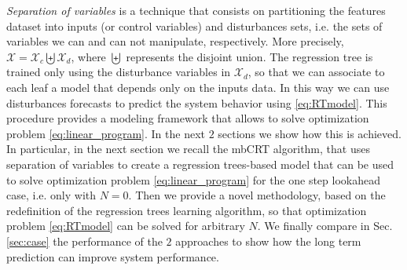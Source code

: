 \textcolor[rgb]{0.00,0.00,1.00}{
\emph{Separation of variables} is a technique that consists on partitioning the features dataset into inputs (or control variables) and disturbances sets, i.e. the sets of variables we can and can not manipulate, respectively. More precisely, $\mathcal{X} = \mathcal{X}_c\biguplus\mathcal{X}_d$, where $\biguplus$ represents the disjoint union. The regression tree is trained only using the disturbance variables in $\mathcal{X}_d$, so that we can associate to each leaf a model that depends only on the inputs data. In this way we can use disturbances forecasts to predict the system behavior using \eqref{eq:RTmodel}. This procedure provides a modeling framework that allows to solve optimization problem \eqref{eq:linear_program}. In the next $2$ sections we show how this is achieved. In particular, in the next section we recall the mbCRT algorithm, that uses separation of variables to create a regression trees-based model that can be used to solve optimization problem \eqref{eq:linear_program} for the one step lookahead case, i.e. only with $N=0$. Then we provide a novel methodology, based on the redefinition of the regression trees learning algorithm, so that optimization problem \eqref{eq:RTmodel} can be solved for arbitrary $N$. We finally compare in Sec. \ref{sec:case} the performance of the $2$ approaches to show how the long term prediction can improve system performance.}
